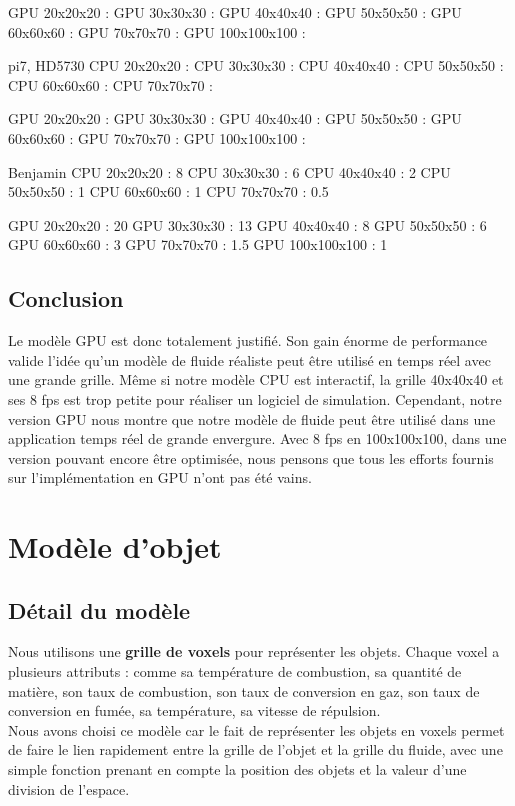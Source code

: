 \documentclass[a4paper,10pt]{article}
\begin{document}
  GPU 20x20x20      : 
  GPU 30x30x30      : 
  GPU 40x40x40      :
  GPU 50x50x50      : 
  GPU 60x60x60      : 
  GPU 70x70x70      :
  GPU 100x100x100   :
  
pi7, HD5730
  CPU 20x20x20      :
  CPU 30x30x30      : 
  CPU 40x40x40      : 
  CPU 50x50x50      :
  CPU 60x60x60      :
  CPU 70x70x70      : 
  
  GPU 20x20x20      : 
  GPU 30x30x30      : 
  GPU 40x40x40      :
  GPU 50x50x50      : 
  GPU 60x60x60      : 
  GPU 70x70x70      :
  GPU 100x100x100   :
  
Benjamin
  CPU 20x20x20      : 8
  CPU 30x30x30      : 6
  CPU 40x40x40      : 2
  CPU 50x50x50      : 1
  CPU 60x60x60      : 1
  CPU 70x70x70      : 0.5
  
  GPU 20x20x20      : 20
  GPU 30x30x30      : 13
  GPU 40x40x40      : 8
  GPU 50x50x50      : 6
  GPU 60x60x60      : 3
  GPU 70x70x70      : 1.5
  GPU 100x100x100   : 1





\subsection{Conclusion}
Le modèle GPU est donc totalement justifié. Son gain énorme de performance valide l'idée
qu'un modèle de fluide réaliste peut être utilisé en temps réel avec une grande grille. 
Même si notre modèle CPU est interactif, la grille 40x40x40 et ses 8 fps est
trop petite pour réaliser un logiciel de simulation. Cependant, notre version GPU
nous montre que notre modèle de fluide peut être utilisé dans une application 
temps réel de grande envergure. Avec 8 fps en 100x100x100, dans une version
pouvant encore être optimisée, nous pensons que tous les efforts fournis
sur l'implémentation en GPU n'ont pas été vains. 




\newpage
\section{Modèle d'objet}

\subsection{Détail du modèle}
Nous utilisons une \textbf{grille de voxels} pour représenter les objets. Chaque voxel
a plusieurs attributs : comme sa température de combustion, sa quantité de matière,
son taux de combustion, son taux de conversion en gaz, son taux de conversion en fumée,
sa température, sa vitesse de répulsion.\\
Nous avons choisi ce modèle car le fait de représenter les objets en voxels
permet de faire le lien rapidement entre la grille de l'objet et la grille du fluide,
avec une simple fonction prenant en compte la position des objets et la valeur d'une division
de l'espace.\\
\end{document}
